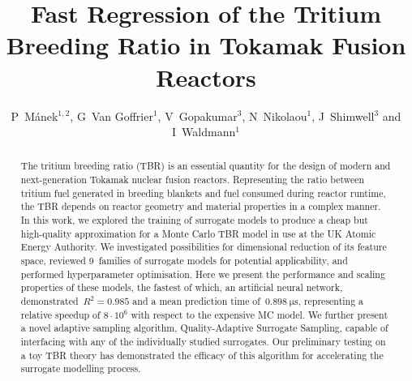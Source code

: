 \documentclass[12pt]{iopart}
\begin{document}

\title[Fast Regression of the Tritium Breeding Ratio in Tokamaks]{Fast Regression of the
Tritium Breeding Ratio in Tokamak Fusion Reactors} %

\author{P~Mánek$^{1,2}$, G~Van Goffrier$^1$, V~Gopakumar$^3$, N~Nikolaou$^1$, J~Shimwell$^3$ and I~Waldmann$^1$}

\address{$^1$ Department of Physics and Astronomy, University College London, Gower Street, London WC1E~6BT, UK}
\address{$^2$ Institute of Experimental and Applied Physics, Czech Technical University, Husova 240/5, Prague 110~00, Czech Republic}
\address{$^3$ UK Atomic Energy Authority, Culham Science Centre, OX14~3DB Abingdon, UK}


\begin{abstract}
	The tritium breeding ratio (TBR) is an essential quantity for the design of
	modern and next-generation Tokamak nuclear fusion reactors. Representing the
	ratio between tritium fuel generated in breeding blankets and fuel consumed
	during reactor runtime, the TBR depends on reactor geometry and material
	properties in a complex manner. In this work, we explored the
	training of surrogate models to produce a cheap but high-quality approximation
	for a Monte Carlo TBR model in use at the UK Atomic Energy Authority. We
	investigated possibilities for dimensional reduction of its feature space, reviewed
	9~families of surrogate models for potential
	applicability, and performed hyperparameter optimisation. Here we present the
	performance and scaling properties of these
	models, the fastest of which, an artificial neural network,
	demonstrated~$R^2=\num{0.985}$ and a mean
	prediction time of~$\SI{0.898}{\micro\second}$, representing a relative speedup of $8\cdot 10^6$
	with respect to the expensive MC model. We further present a novel adaptive
	sampling algorithm, Quality-Adaptive Surrogate Sampling, capable
	of interfacing with any of the individually studied surrogates. Our preliminary
	testing on a toy TBR theory has demonstrated the efficacy of this algorithm for
	accelerating the surrogate modelling process.
\end{abstract}
\end{document}
